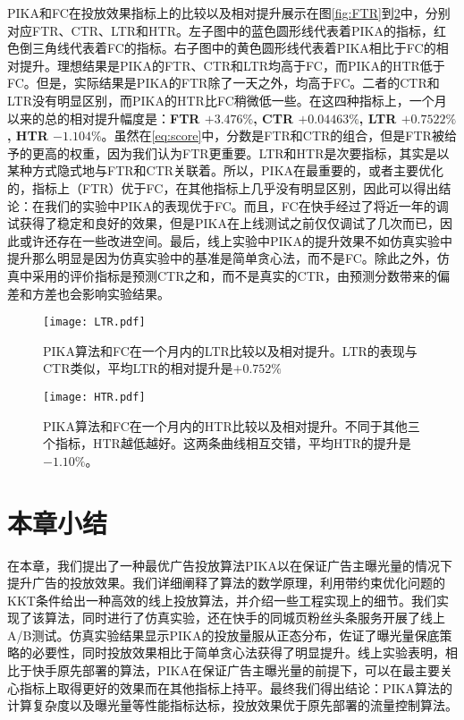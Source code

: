 PIKA和FC在投放效果指标上的比较以及相对提升展示在图\ref{fig:FTR}到\ref{fig:HTR}中，分别对应FTR、CTR、LTR和HTR。左子图中的蓝色圆形线代表着PIKA的指标，红色倒三角线代表着FC的指标。右子图中的黄色圆形线代表着PIKA相比于FC的相对提升。理想结果是PIKA的FTR、CTR和LTR均高于FC，而PIKA的HTR低于FC。但是，实际结果是PIKA的FTR除了一天之外，均高于FC。二者的CTR和LTR没有明显区别，而PIKA的HTR比FC稍微低一些。在这四种指标上，一个月以来的总的相对提升幅度是：\textbf{FTR $+3.476\%$, CTR $+0.04463\%$, LTR $+0.7522\%$, HTR $-1.104\%$}。虽然在\eqref{eq:score}中，分数是FTR和CTR的组合，但是FTR被给予的更高的权重，因为我们认为FTR更重要。LTR和HTR是次要指标，其实是以某种方式隐式地与FTR和CTR关联着。所以，PIKA在最重要的，或者主要优化的，指标上（FTR）优于FC，在其他指标上几乎没有明显区别，因此可以得出结论：在我们的实验中PIKA的表现优于FC。而且，FC在快手经过了将近一年的调试获得了稳定和良好的效果，但是PIKA在上线测试之前仅仅调试了几次而已，因此或许还存在一些改进空间。最后，线上实验中PIKA的提升效果不如仿真实验中提升那么明显是因为仿真实验中的基准是简单贪心法，而不是FC。除此之外，仿真中采用的评价指标是预测CTR之和，而不是真实的CTR，由预测分数带来的偏差和方差也会影响实验结果。

\begin{figure}[tb]
	\centering
	\texttt{[image: LTR.pdf]}
	\caption{PIKA算法和FC在一个月内的LTR比较以及相对提升。LTR的表现与CTR类似，平均LTR的相对提升是$+0.752\%$}
	\label{fig:LTR}
\end{figure}

\begin{figure}[tb]
	\centering
	\texttt{[image: HTR.pdf]}
	\caption{PIKA算法和FC在一个月内的HTR比较以及相对提升。不同于其他三个指标，HTR越低越好。这两条曲线相互交错，平均HTR的提升是$-1.10\%$。}
	\label{fig:HTR}
\end{figure}

\section{本章小结}

在本章，我们提出了一种最优广告投放算法PIKA以在保证广告主曝光量的情况下提升广告的投放效果。我们详细阐释了算法的数学原理，利用带约束优化问题的KKT条件给出一种高效的线上投放算法，并介绍一些工程实现上的细节。我们实现了该算法，同时进行了仿真实验，还在快手的同城页粉丝头条服务开展了线上A/B测试。仿真实验结果显示PIKA的投放量服从正态分布，佐证了曝光量保底策略的必要性，同时投放效果相比于简单贪心法获得了明显提升。线上实验表明，相比于快手原先部署的算法，PIKA在保证广告主曝光量的前提下，可以在最主要关心指标上取得更好的效果而在其他指标上持平。最终我们得出结论：PIKA算法的计算复杂度以及曝光量等性能指标达标，投放效果优于原先部署的流量控制算法。






